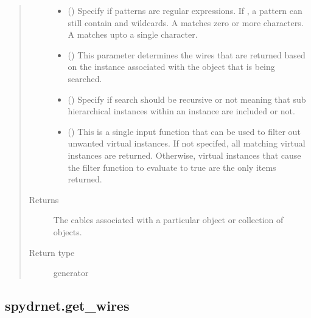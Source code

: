 \documentclass[letterpaper,10pt,english,openany,oneside]{sphinxmanual}
\begin{document}
\begin{fulllineitems}
\begin{quote}
\begin{description}
\begin{itemize}
\item {} 
 () \textendash{} Specify if patterns are regular expressions. If , a pattern can still contain \sphinxtitleref{*} and  wildcards. A
\sphinxtitleref{*} matches zero or more characters. A  matches upto a single character.

\item {} 
 () \textendash{} This parameter determines the wires that are returned based on the instance associated with the object that is
being searched.

\item {} 
 () \textendash{} Specify if search should be recursive or not meaning that sub hierarchical instances within an instance are
included or not.

\item {} 
 () \textendash{} This is a single input function that can be used to filter out unwanted virtual instances. If not specifed, all
matching virtual instances are returned. Otherwise, virtual instances that cause the filter function to evaluate
to true are the only items returned.

\end{itemize}

\item[{Returns}] \leavevmode
{} \textendash{} The cables associated with a particular object or collection of objects.

\item[{Return type}] \leavevmode
generator

\end{description}\end{quote}

\end{fulllineitems}



\subsection{spydrnet.get\_wires}
\label{\detokenize{reference/classes/generated/spydrnet.get_wires:spydrnet-get-wires}}\label{\detokenize{reference/classes/generated/spydrnet.get_wires::doc}}
\end{document}
